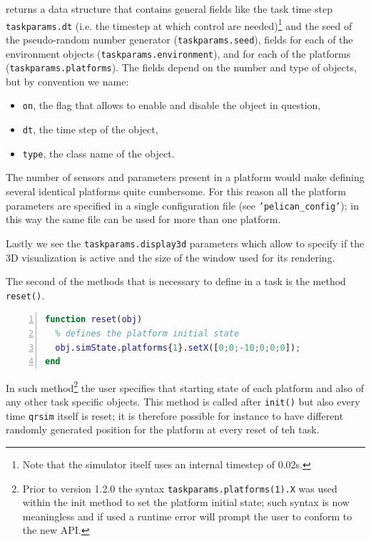 \documentclass[a4paper,11pt]{report}
\begin{document}
returns a data structure that contains general fields like the task time step \texttt{taskparams.dt} (i.e. the timestep at which control are needed)\footnote{Note that the simulator itself uses an internal timestep of $0.02$s.} and the seed of the pseudo-random number generator (\texttt{taskparams.seed}), fields for each of the environment objects (\texttt{taskparams.environment}), and for each of the platforms (\texttt{taskparams.platforms}). The fields depend on the number and type of objects, but by convention we name:
\begin{itemize}
\item \texttt{on}, the flag that allows to enable and disable the object in question,
\item \texttt{dt}, the time step of the object,
\item \texttt{type}, the class name of the object.
\end{itemize}

The number of sensors and parameters present in a platform would make defining several identical platforms quite cumbersome. For this reason all the platform parameters are specified in a single configuration file (see \texttt{'pelican\_config'}); in this way the same file can be used for more than one platform. 

Lastly we see the \texttt{taskparams.display3d} parameters which allow to specify if the 3D visualization is active and the size of the window used for its rendering. 

The second of the methods that is necessary to define in a task is the method \texttt{reset()}.
\begin{lstlisting}[float=ht!bp,caption=TaskKeepSpot reset() method,language=Matlab,frame=lines,label=lst:reset,numbers=left,basicstyle=\small]   
function reset(obj)
  % defines the platform initial state
  obj.simState.platforms{1}.setX([0;0;-10;0;0;0]); 
end
\end{lstlisting}
In such method\footnote{Prior to version 1.2.0 the syntax \texttt{taskparams.platforms(1).X} was used within the init method to set the platform initial state; such syntax is now meaningless and if used a runtime error will prompt the user to conform to the new API.} the user specifies that starting state of each platform and also of any other task specific objects.
This method is called after \texttt{init()} but also every time \texttt{qrsim} itself is reset; it is therefore possible for instance to have different randomly generated position for the platform at every reset of teh task. 
\end{document}
